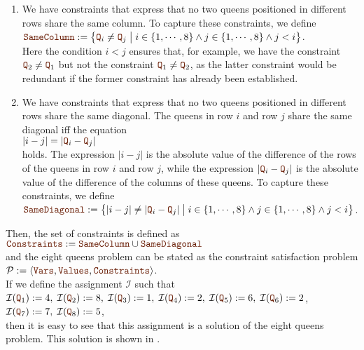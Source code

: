 \begin{enumerate}
\item We have constraints that express that no two queens positioned in different rows share the same column.
      To capture these constraints, we define
      \\[0.2cm]
      \hspace*{1.3cm}
      $\mytt{SameColumn} := \bigl\{ \mytt{Q}_i \not= \mytt{Q}_j \bigm| i \in \{1,\cdots,8\} \wedge j \in \{1,\cdots,8\} \wedge j < i \bigr\}$.
      \\[0.2cm]
      Here the condition $i < j$ ensures that, for example, we have the constraint $\mytt{Q}_2 \not= \mytt{Q}_1$
      but not the constraint  $\mytt{Q}_1 \not= \mytt{Q}_2$, as the latter constraint would be redundant if
      the former constraint has already been established.
\item We have constraints that express that no two queens positioned in different rows share the same 
      diagonal.  The queens in row $i$ and row $j$ share the same diagonal iff the equation
      \\[0.2cm]
      \hspace*{1.3cm}
      $|i - j| = |\mytt{Q}_i - \mytt{Q}_j|$
      \\[0.2cm]
      holds.  The expression $|i-j|$ is the absolute value of the difference of the rows of the queens in row
      $i$ and row $j$,  while the expression $|\mytt{Q}_i - \mytt{Q}_j|$ is the absolute value of the difference of the
      columns of these queens.  To capture these constraints, we define
      \\[0.2cm]
      \hspace*{1.3cm}
      $\mytt{SameDiagonal} := \bigl\{ |i  - j| \not= |\mytt{Q}_i - \mytt{Q}_j| \bigm| i \in \{1,\cdots,8\} \wedge j \in \{1,\cdots,8\} \wedge j < i \bigr\}$.
\end{enumerate}
Then, the set of constraints is defined as 
\\[0.2cm]
\hspace*{1.3cm}
$\mytt{Constraints} := \mytt{SameColumn} \cup \mytt{SameDiagonal}$
\\[0.2cm]
and the eight queens problem can be stated as the constraint satisfaction problem
\\[0.2cm]
\hspace*{1.3cm}
$\mathcal{P} := \langle \mytt{Vars}, \mytt{Values}, \mytt{Constraints} \rangle$.
\\[0.2cm]
If we define the assignment $\mathcal{I}$ such that
\\[0.2cm]
\hspace*{1.3cm}
$\mathcal{I}(\mytt{Q}_1) := 4,\; \mathcal{I}(\mytt{Q}_2) := 8,\; \mathcal{I}(\mytt{Q}_3) := 1,\;
\mathcal{I}(\mytt{Q}_4) := 2,\; \mathcal{I}(\mytt{Q}_5) := 6,\; \mathcal{I}(\mytt{Q}_6) := 2$,
\\[0.2cm]
\hspace*{1.3cm}
$\mathcal{I}(\mytt{Q}_7) := 7,\; \mathcal{I}(\mytt{Q}_8) := 5$,
\\[0.2cm]
then it is easy to see that this assignment is a solution of the eight queens problem.  This solution is shown
in .


